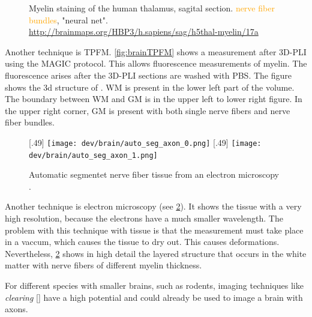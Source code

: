 \begin{figure}[p]
	\caption[Myelin staining of the human thalamus]{Myelin staining of the human thalamus, sagital section. \textcolor{Orange}{nerve fiber bundles}, \textcolor{ProcessBlue}{"neural net"}. \url{http://brainmaps.org/HBP3/h.sapiens/sag/h5thal-myelin/17a}}
	\label{fig:brainMyelinStain}
\end{figure}
%
Another technique is \ac{TPFM}.
\cref{fig:brainTPFM} shows a measurement after \ac{3D-PLI} using the \ac{MAGIC} protocol.
This allows fluorescence measurements of myelin.
The fluorescence arises after the \ac{3D-PLI} sections are \cite{Costantini2021} washed with \ac{PBS}.
The figure shows the 3d structure of .
\ac{WM} is present in the lower left part of the volume.
The boundary between \ac{WM} and \ac{GM} is in the upper left to lower right figure.
In the upper right corner, \ac{GM} is present with both single nerve fibers and nerve fiber bundles.
% 
\newpage
\begin{figure}[!t]
	\centering
	\subcaptionbox{}[.49\textwidth]{
	    \texttt{[image: dev/brain/auto\_seg\_axon\_0.png]}}\hfill
    \subcaptionbox{}[.49\textwidth]{
        \texttt{[image: dev/brain/auto\_seg\_axon\_1.png]}}
	\caption{Automatic segmentet nerve fiber tissue from an electron microscopy \cite{Abdollahzadeh2019}.}
	\label{fig:elecMic}
\end{figure}
% 
Another technique is electron microscopy (see \cref{fig:elecMic}).
It shows the tissue with a very high resolution, because the electrons have a much smaller wavelength.
The problem with this technique with tissue is that the measurement must take place in a vaccum, which causes the tissue to dry out.
This causes deformations.
Nevertheless, \cref{fig:elecMic} shows in high detail the layered structure that occurs in the white matter with nerve fibers of different myelin thickness.
\par
%
For different species with smaller brains, such as rodents, imaging techniques like \textit{clearing} [\dummy{}] have a high potential and could already be used to image a  brain with axons.
